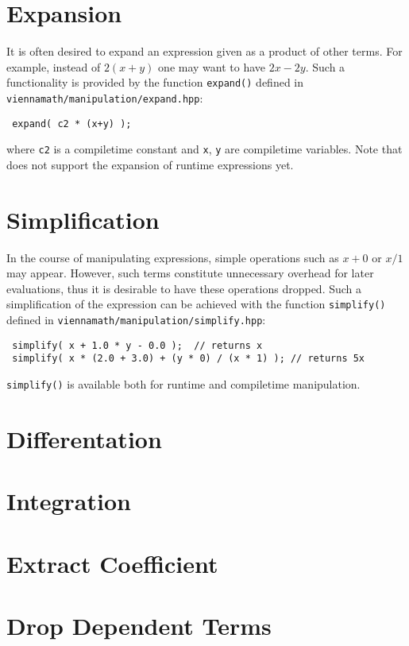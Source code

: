  \section{Expansion}
It is often desired to expand an expression given as a product of other terms. For example, instead of $2(x+y)$ one may want to have $2x - 2y$.
Such a functionality is provided by the function \lstinline|expand()| defined in \lstinline|viennamath/manipulation/expand.hpp|:
\begin{lstlisting}
 expand( c2 * (x+y) );
\end{lstlisting}
where \lstinline|c2| is a compiletime constant and \lstinline|x|, \lstinline|y| are compiletime variables.
Note that {\ViennaMathversion} does not support the expansion of runtime expressions yet.




 \section{Simplification}
In the course of manipulating expressions, simple operations such as $x+0$ or $x/1$ may appear.
However, such terms constitute unnecessary overhead for later evaluations, thus it is desirable to have these operations dropped.
Such a simplification of the expression can be achieved with the function \lstinline|simplify()| defined in \lstinline|viennamath/manipulation/simplify.hpp|:
\begin{lstlisting}
 simplify( x + 1.0 * y - 0.0 );  // returns x
 simplify( x * (2.0 + 3.0) + (y * 0) / (x * 1) ); // returns 5x
\end{lstlisting}
\lstinline|simplify()| is available both for runtime and compiletime manipulation.


 \section{Differentation}



 \section{Integration}




 \section{Extract Coefficient}




 \section{Drop Dependent Terms}





